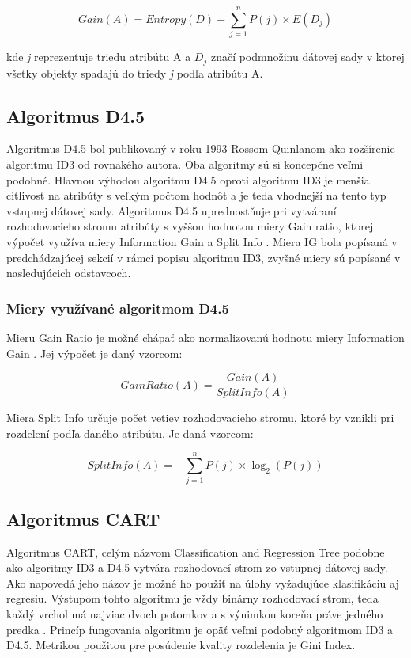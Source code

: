 \documentclass[slovak, master]{diploma}
\begin{document}
\[Gain(A) = Entropy(D) - \displaystyle\sum\limits_{j=1}^n P(j) \times E(D_j)\]

kde \textit{j} reprezentuje triedu atribútu A a $D_j$ značí podmnožinu dátovej sady v ktorej všetky objekty spadajú do triedy \textit{j} podľa atribútu A.

\subsection{Algoritmus D4.5}
\label{sec:D45}
Algoritmus D4.5 bol publikovaný v roku 1993 Rossom Quinlanom ako rozšírenie algoritmu ID3 od rovnakého autora. Oba algoritmy sú si koncepčne veľmi podobné. Hlavnou výhodou algoritmu D4.5 oproti algoritmu ID3 je menšia citlivosť na atribúty s veľkým počtom hodnôt a je teda vhodnejší na tento typ vstupnej dátovej sady. Algoritmus D4.5 uprednostňuje pri vytváraní rozhodovacieho stromu atribúty s vyššou hodnotou miery Gain ratio, ktorej výpočet využíva miery Information Gain a Split Info \cite{hssina2014comparative}. Miera IG bola popísaná v predchádzajúcej sekcií v rámci popisu algoritmu ID3, zvyšné miery sú popísané v nasledujúcich odstavcoch.

\subsubsection*{Miery využívané algoritmom D4.5}
\label{sec:D45miery}
Mieru Gain Ratio je možné chápať ako normalizovanú hodnotu miery Information Gain \cite{hssina2014comparative}. Jej výpočet je daný vzorcom:

\[GainRatio(A) = \frac{Gain(A)}{SplitInfo(A)}\]

Miera Split Info určuje počet vetiev rozhodovacieho stromu, ktoré by vznikli pri rozdelení podľa daného atribútu. Je daná vzorcom:

\[SplitInfo(A) = - \displaystyle\sum\limits_{j=1}^n P(j) \times \log_2(P(j))\]

\subsection{Algoritmus CART}
\label{sec:CART}
Algoritmus CART, celým názvom Classification and Regression Tree podobne ako algoritmy ID3 a D4.5 vytvára rozhodovací strom zo vstupnej dátovej sady. Ako napovedá jeho názov je možné ho použiť na úlohy vyžadujúce klasifikáciu aj regresiu. Výstupom tohto algoritmu je vždy binárny rozhodovací strom, teda každý vrchol má najviac dvoch potomkov a s výnimkou koreňa práve jedného predka \cite{CART}. Princíp fungovania algoritmu je opäť veľmi podobný algoritmom ID3 a D4.5. Metrikou použitou pre posúdenie kvality rozdelenia je Gini Index.
\end{document}
